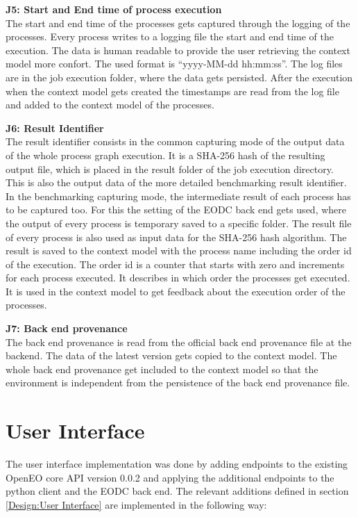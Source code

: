\documentclass[draft,final]{vutinfth} %
\begin{document}
\textbf{J5: Start and End time of process execution} \\
The start and end time of the processes gets captured through the logging of the processes. Every process writes to a logging file the start and end time of the execution. The data is human readable to provide the user retrieving the context model more confort. The used format is “yyyy-MM-dd hh:mm:ss”. The log files are in the job execution folder, where the data gets persisted. After the execution when the context model gets created the timestamps are read from the log file and added to the context model of the processes. 

\textbf{J6: Result Identifier } \\
The result identifier consists in the common capturing mode of the output data of the whole process graph execution. It is a SHA-256 hash of the resulting output file, which is placed in the result folder of the job execution directory. This is also the output data of the more detailed benchmarking result identifier. In the benchmarking capturing mode, the intermediate result of each process has to be captured too. For this the setting of the EODC back end gets used, where the output of every process is temporary saved to a specific folder. The result file of every process is also used as input data for the SHA-256 hash algorithm. The result is saved to the context model with the process name including the order id of the execution. The order id is a counter that starts with zero and increments for each process executed. It describes in which order the processes get executed. It is used in the context model to get feedback about the execution order of the processes.

\textbf{J7: Back end provenance} \\
The back end provenance is read from the official back end provenance file at the backend. The data of the latest version gets copied to the context model. The whole back end provenance get included to the context model so that the environment is independent from the persistence of the back end provenance file. 

\section{User Interface}\label{Implementation:User Interface}
The user interface implementation was done by adding endpoints to the existing OpenEO core API version 0.0.2 and applying the additional endpoints to the python client and the EODC back end. The relevant additions defined in section \ref{Design:User Interface} are implemented in the following way:
\end{document}
